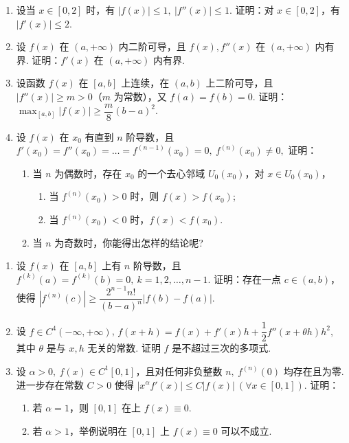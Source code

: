 \begin{enumerate}[label=\textbf{\arabic*.}, itemsep=6cm, resume]
    \item 设当 $x\in[0,2]$ 时，有 $|f(x)|\le1,\ |f''(x)|\le1$. 证明：对 $x\in[0,2]$，有 $|f'(x)|\le2$.
    
    \item 设 $f(x)$ 在 $(a,+\infty)$ 内二阶可导，且 $f(x),f''(x)$ 在 $(a,+\infty)$ 内有界. 证明：$f'(x)$ 在 $(a,+\infty)$ 内有界.
    
    \item 设函数 $f(x)$ 在 $[a,b]$ 上连续，在 $(a,b)$ 上二阶可导，且 $|f''(x)|\ge m>0$（$m$ 为常数），又 $f(a)=f(b)=0$. 证明：
    $ \max_{[a,b]}|f(x)|\ge\dfrac{m}{8}(b-a)^2. $
    
    \item 设 $f(x)$ 在 $x_0$ 有直到 $n$ 阶导数，且
    $ f'(x_0)=f''(x_0)=\dots=f^{(n-1)}(x_0)=0,\ f^{(n)}(x_0)\ne0, $
    证明：
    \begin{enumerate}[label=(\arabic*)]
        \item 当 $n$ 为偶数时，存在 $x_0$ 的一个去心邻域 $U_0(x_0)$，对 $x\in U_0(x_0)$，
        \begin{enumerate}[label=a)]
            \item 当 $f^{(n)}(x_0)>0$ 时，则 $f(x)>f(x_0)$;
            \item 当 $f^{(n)}(x_0)<0$ 时，$f(x)<f(x_0)$.
        \end{enumerate}
        \item 当 $n$ 为奇数时，你能得出怎样的结论呢?
    \end{enumerate}
\end{enumerate}

\newpage

\begin{enumerate}[label=\textbf{\arabic*.}, itemsep=6cm, resume]
    \item 设 $f(x)$ 在 $[a,b]$ 上有 $n$ 阶导数，且
    $ f^{(k)}(a)=f^{(k)}(b)=0,\ k=1,2,\dots,n-1. $
    证明：存在一点 $c\in(a,b)$，使得
    $ |f^{(n)}(c)|\ge\dfrac{2^{n-1}n!}{(b-a)^n}|f(b)-f(a)|. $
    
    \item 设 $f\in C^4(-\infty,+\infty)$,
    $ f(x+h)=f(x)+f'(x)h+\dfrac{1}{2}f''(x+\theta h)h^2, $
    其中 $\theta$ 是与 $x,h$ 无关的常数. 证明 $f$ 是不超过三次的多项式.
    
    \item 设 $\alpha>0,\ f(x)\in C^1[0,1]$，且对任何非负整数 $n,\ f^{(n)}(0)$ 均存在且为零. 进一步存在常数 $C>0$ 使得
    $ |x^\alpha f'(x)|\le C|f(x)|\ (\forall x\in[0,1]). $
    证明：
    \begin{enumerate}[label=(\arabic*)]
        \item 若 $\alpha=1$，则 $[0,1]$ 在上 $f(x)\equiv0$.
        \item 若 $\alpha>1$，举例说明在 $[0,1]$ 上 $f(x)\equiv0$ 可以不成立.
    \end{enumerate}
\end{enumerate}

